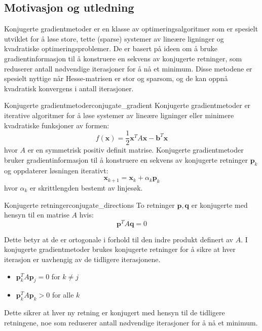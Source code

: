 \subsection{Motivasjon og utledning}
\label{subsec:cg_motivation}
Konjugerte gradientmetoder er en klasse av optimeringsalgoritmer som er spesielt utviklet for å løse store, tette (sparse) systemer av lineære ligninger og kvadratiske optimeringsproblemer. De er basert på ideen om å bruke gradientinformasjon til å konstruere en sekvens av konjugerte retninger, som reduserer antall nødvendige iterasjoner for å nå et minimum.
Disse metodene er spesielt nyttige når Hesse-matrisen er stor og sparsom, og de kan oppnå kvadratisk konvergens i antall iterasjoner.
\begin{definition}{Konjugerte gradientmetoder}{conjugate_gradient}
	Konjugerte gradientmetoder er iterative algoritmer for å løse systemer av lineære ligninger eller minimere kvadratiske funksjoner av formen:
	\[
		f(\symbf{x}) = \frac{1}{2} \symbf{x}^T A \symbf{x} - \symbf{b}^T \symbf{x}
	\]
	hvor \(A\) er en symmetrisk positiv definit matrise.
	Konjugerte gradientmetoder bruker gradientinformasjon til å konstruere en sekvens av konjugerte retninger \(\symbf{p}_k\) og oppdaterer løsningen iterativt:
	\[
		\symbf{x}_{k+1} = \symbf{x}_k + \alpha_k \symbf{p}_k
	\]
	hvor \(\alpha_k\) er skrittlengden bestemt av linjesøk.
\end{definition}

\begin{definition}{Konjugerte retninger}{conjugate_directions}
	To retninger \(\symbf{p}, \symbf{q}\) er konjugerte med hensyn til en matrise \(A\) hvis:
	\[
		\symbf{p}^T A \symbf{q} = 0
	\]
\end{definition}

Dette betyr at de er ortogonale i forhold til den indre produkt definert av \(A\). I konjugerte gradientmetoder brukes konjugerte retninger for å sikre at hver iterasjon er uavhengig av de tidligere iterasjonene.
\begin{itemize}
	\item \(\symbf{p}_k^T A \symbf{p}_j = 0\) for \(k \neq j\)
	\item \(\symbf{p}_k^T A \symbf{p}_k > 0\) for alle \(k\)
\end{itemize}
Dette sikrer at hver ny retning er konjugert med hensyn til de tidligere retningene, noe som reduserer antall nødvendige iterasjoner for å nå et minimum.

